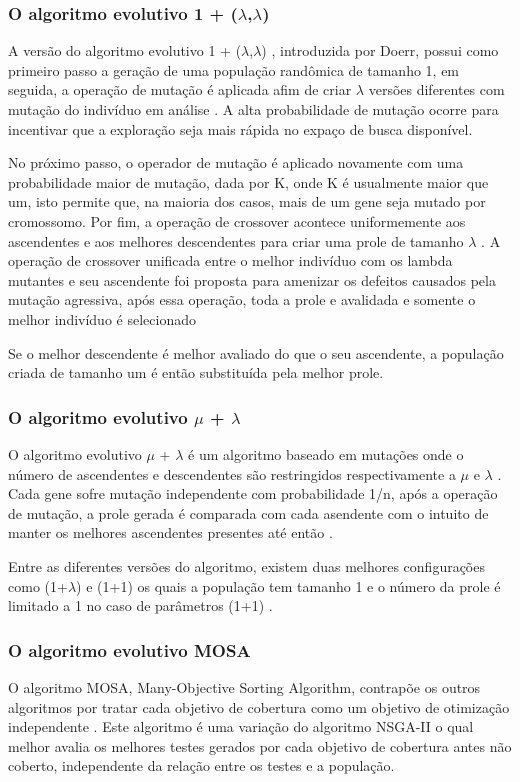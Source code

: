 \documentclass[
	12pt,				%
	oneside,			%
	a4paper,			%
	english,			%
	brazil				%
	]{abntex2ppgsi}
\begin{document}
\subsubsection{O algoritmo evolutivo 1 + ($\lambda$,$\lambda$)}
A versão do algoritmo evolutivo 1 + ($\lambda$,$\lambda$) , introduzida por Doerr, possui como primeiro passo a geração de uma população randômica de tamanho 1, em seguida, a operação de mutação é aplicada afim de criar $\lambda$ versões diferentes com mutação do indivíduo em análise \cite{Campos2017}. A alta probabilidade de mutação ocorre para incentivar que a exploração seja mais rápida no expaço de busca disponível. \cite{Campos2017}

No próximo passo, o operador de mutação é aplicado novamente com uma probabilidade maior de mutação, dada por K, onde K é usualmente maior que um, isto permite que, na maioria dos casos, mais de um gene seja mutado por cromossomo. Por fim, a operação de crossover acontece uniformemente aos ascendentes e aos melhores descendentes para criar uma prole de  tamanho $\lambda$  \cite{Campos2017}. A operação de crossover unificada entre o melhor indivíduo com os lambda mutantes e seu ascendente foi proposta para amenizar os defeitos causados pela mutação agressiva, após essa operação, toda a prole e avalidada e somente o melhor indivíduo é selecionado \cite{Campos2017}

Se o melhor descendente é melhor avaliado do que o seu ascendente, a população criada de tamanho um é então substituída pela melhor prole. \cite{Campos2017}

\subsubsection{O algoritmo evolutivo  $\mu$ + $\lambda$}

O algoritmo evolutivo $\mu$ + $\lambda$  é um algoritmo baseado em mutações onde o número de ascendentes e descendentes são restringidos respectivamente  a $\mu$ e $\lambda$ \cite{Campos2017}. Cada gene sofre mutação independente com probabilidade 1/n, após a operação de mutação, a prole gerada é comparada com cada asendente com o intuito de manter os melhores ascendentes presentes até então \cite{Campos2017}.

Entre as diferentes versões do algoritmo, existem duas melhores configurações como (1+$\lambda$) e (1+1) os quais a população tem tamanho 1 e o número da prole é limitado a 1 no caso de parâmetros (1+1) \cite{Campos2017}.

\subsubsection{O algoritmo evolutivo MOSA}
O algoritmo MOSA, Many-Objective Sorting Algorithm, contrapõe os outros algoritmos por tratar cada objetivo de cobertura como um objetivo de otimização independente \cite{Campos2017}. Este algoritmo é uma variação do algoritmo NSGA-II o qual melhor avalia os melhores testes gerados por cada objetivo de cobertura antes não coberto, independente da relação entre os testes e a população. \cite{Campos2017}
\end{document}
